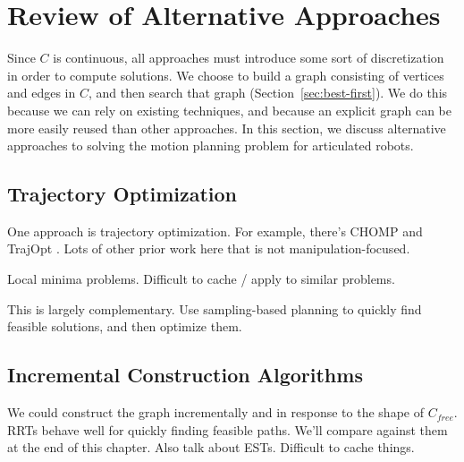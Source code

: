 \documentclass{report}
\begin{document}
\section{Review of Alternative Approaches}
\label{sec:related-work}

Since $C$ is continuous,
all approaches must introduce some sort of discretization
in order to compute solutions.
We choose to build a graph consisting of vertices and edges in $C$,
and then search that graph (Section~\ref{sec:best-first}).
We do this because we can rely on existing techniques,
and because an explicit graph can be more easily reused than other
approaches.
In this section, we discuss alternative approaches to solving
the motion planning problem for articulated robots.

\subsection{Trajectory Optimization}

One approach is trajectory optimization.
For example, there's CHOMP \cite{zucker2013chomp}
and TrajOpt \cite{schulman2013trajopt}.
Lots of other prior work here that is not manipulation-focused.

Local minima problems.
Difficult to cache / apply to similar problems.

This is largely complementary.
Use sampling-based planning to quickly find feasible solutions,
and then optimize them.

\subsection{Incremental Construction Algorithms}

We could construct the graph incrementally and in response to the shape
of $C_{free}$.
RRTs behave well for quickly finding feasible paths.
We'll compare against them at the end of this chapter.
Also talk about ESTs.
Difficult to cache things.

%
\end{document}

